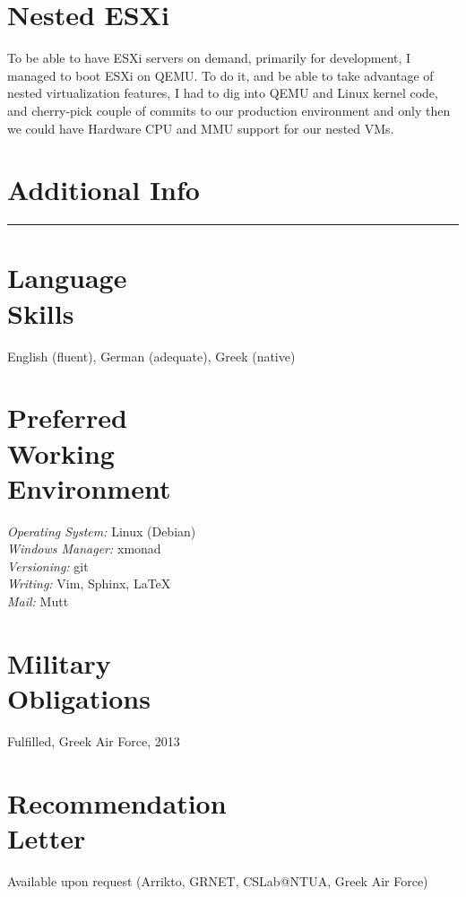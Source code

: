 \documentclass[margin,centered]{res}
\begin{document}
\begin{resume}
\section{\sc Nested ESXi}
To be able to have ESXi servers on demand, primarily for development, I managed
to boot ESXi on QEMU. To do it, and be able to take advantage of nested
virtualization features, I had to dig into QEMU and Linux kernel code, and
cherry-pick couple of commits to our production environment and only then we
could have Hardware CPU and MMU support for our nested VMs.


\section{Additional Info}
\rule[3pt]{\textwidth}{0.4pt}

\section{\sc Language\\Skills}
English (fluent), German (adequate), Greek (native)

\section{\sc Preferred\\Working\\Environment}
\textit{Operating System:} Linux (Debian)\\
\textit{Windows Manager:} xmonad\\
\textit{Versioning:} git\\
\textit{Writing:} Vim, Sphinx, \LaTeX\\
\textit{Mail:} Mutt

\section{\sc Military\\Obligations}
Fulfilled, Greek Air Force, 2013

\section{\sc Recommendation\\Letter}
Available upon request (Arrikto, GRNET, CSLab@NTUA, Greek Air Force)

\end{resume}

\def\enoteheading{\section{Notes}\rule[0pt]{\textwidth}{0.4pt}}
\parskip=2pt
\theendnotes
\end{document}
